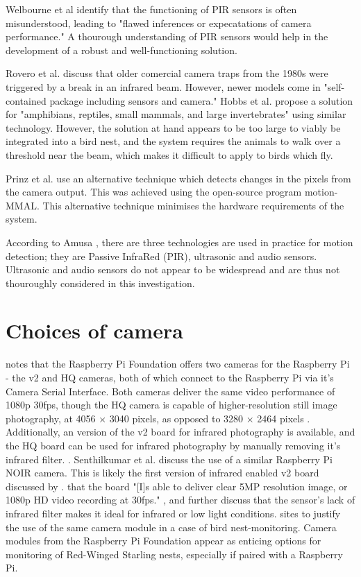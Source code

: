 \documentclass[class=report,11pt,crop=false]{standalone}
\begin{document}
Welbourne et al \cite{welbourne2016how} identify that the functioning of PIR sensors is often misunderstood, leading to "flawed inferences or expecatations of camera performance." A thourough understanding of PIR sensors would help in the development of a robust and well-functioning solution.

Rovero et al. \cite{rovero2013which} discuss that older comercial camera traps from the 1980s were triggered by a break in an infrared beam. However, newer models come in "self-contained package including sensors and camera." Hobbs et al. propose a solution for "amphibians, reptiles, small mammals, and large invertebrates" \cite{hobbs2017an} using similar technology. However, the solution at hand appears to be too large to viably be integrated into a bird nest, and the system requires the animals to walk over a threshold near the beam, which makes it difficult to apply to birds which fly.

Prinz et al. \cite{prinz2016a} use an alternative technique which detects changes in the pixels from the camera output. This was achieved using the open-source program motion-MMAL. This alternative technique minimises the hardware requirements of the system.

According to Amusa \cite{amusa2015pyro}, there are three technologies are used in practice for motion detection; they are Passive InfraRed (PIR), ultrasonic and audio sensors. Ultrasonic and audio sensors do not appear to be widespread and are thus not thouroughly considered in this investigation.


\section{Choices of camera}

\cite{jolles2021broad-scale} notes that the Raspberry Pi Foundation offers two cameras for the Raspberry Pi - the v2 and HQ cameras, both of which connect to the Raspberry Pi via it's Camera Serial Interface. Both cameras deliver the same video performance of 1080p 30fps, though the HQ camera is capable of higher-resolution still image photography, at 4056 × 3040 pixels, as opposed to 3280 × 2464 pixels \cite{jolles2021broad-scale}. Additionally, an version of the v2 board for infrared photography is available, and the HQ board can be used for infrared photography by manually removing it's infrared filter. \cite{jolles2021broad-scale}. Senthilkumar et al. \cite{senthilkumar2014embedded} discuss the use of a similar Raspberry Pi NOIR camera. This is likely the first version of infrared enabled v2 board discussed by \cite{jolles2021broad-scale}. \cite{senthilkumar2014embedded} that the board "[I]s able to deliver clear 5MP resolution image, or 1080p HD video recording at 30fps." \cite{senthilkumar2014embedded}, and further discuss that the sensor's lack of infrared filter makes it ideal for infrared or low light conditions. \cite{prinz2016a} sites \cite{senthilkumar2014embedded} to justify the use of the same camera module in a case of bird nest-monitoring. Camera modules from the Raspberry Pi Foundation appear as enticing options for monitoring of Red-Winged Starling nests, especially if paired with a Raspberry Pi.
\end{document}
